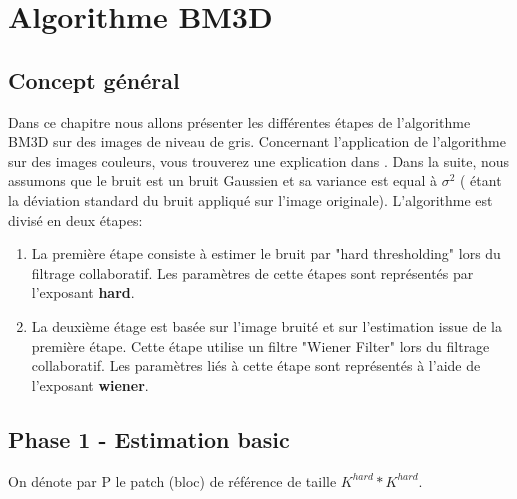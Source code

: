 
\chapter{Algorithme BM3D}
\section{Concept général}
Dans ce chapitre nous allons présenter les différentes étapes de l'algorithme BM3D sur des images de niveau de gris. Concernant l'application de l'algorithme sur des images couleurs, vous trouverez une explication dans \cite{2}. Dans la suite, nous assumons que le bruit est un bruit Gaussien et sa variance est equal à \(\sigma^2\) (\sigma \: étant la déviation standard du bruit appliqué sur l'image originale).
\newline
\newline
L'algorithme est divisé en deux étapes:
\newline
\newline
\begin{enumerate}
\item La première étape consiste à estimer le bruit par "hard thresholding" lors du filtrage collaboratif. Les paramètres de cette étapes sont représentés par l'exposant \textbf{hard}.
\item La deuxième étage est basée sur l'image bruité et sur l'estimation issue de la première étape. Cette étape utilise un filtre "Wiener Filter" lors du filtrage collaboratif. Les paramètres liés à cette étape sont représentés à l'aide de l'exposant \textbf{wiener}.
\end{enumerate}
\newpage

\section{Phase 1 - Estimation basic}
On dénote par P le patch (bloc) de référence de taille \(K^{hard} * K^{hard}\).
